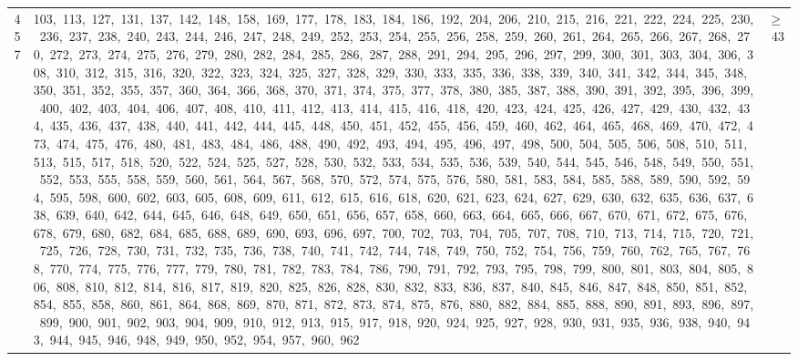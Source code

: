 \begin{longtable}{c|p{}|r}
457 & 103,\ 113,\ 127,\ 131,\ 137,\ 142,\ 148,\ 158,\ 169,\ 177,\ 178,\ 183,\ 184,\ 186,\ 192,\ 204,\ 206,\ 210,\ 215,\ 216,\ 221,\ 222,\ 224,\ 225,\ 230,\ 236,\ 237,\ 238,\ 240,\ 243,\ 244,\ 246,\ 247,\ 248,\ 249,\ 252,\ 253,\ 254,\ 255,\ 256,\ 258,\ 259,\ 260,\ 261,\ 264,\ 265,\ 266,\ 267,\ 268,\ 270,\ 272,\ 273,\ 274,\ 275,\ 276,\ 279,\ 280,\ 282,\ 284,\ 285,\ 286,\ 287,\ 288,\ 291,\ 294,\ 295,\ 296,\ 297,\ 299,\ 300,\ 301,\ 303,\ 304,\ 306,\ 308,\ 310,\ 312,\ 315,\ 316,\ 320,\ 322,\ 323,\ 324,\ 325,\ 327,\ 328,\ 329,\ 330,\ 333,\ 335,\ 336,\ 338,\ 339,\ 340,\ 341,\ 342,\ 344,\ 345,\ 348,\ 350,\ 351,\ 352,\ 355,\ 357,\ 360,\ 364,\ 366,\ 368,\ 370,\ 371,\ 374,\ 375,\ 377,\ 378,\ 380,\ 385,\ 387,\ 388,\ 390,\ 391,\ 392,\ 395,\ 396,\ 399,\ 400,\ 402,\ 403,\ 404,\ 406,\ 407,\ 408,\ 410,\ 411,\ 412,\ 413,\ 414,\ 415,\ 416,\ 418,\ 420,\ 423,\ 424,\ 425,\ 426,\ 427,\ 429,\ 430,\ 432,\ 434,\ 435,\ 436,\ 437,\ 438,\ 440,\ 441,\ 442,\ 444,\ 445,\ 448,\ 450,\ 451,\ 452,\ 455,\ 456,\ 459,\ 460,\ 462,\ 464,\ 465,\ 468,\ 469,\ 470,\ 472,\ 473,\ 474,\ 475,\ 476,\ 480,\ 481,\ 483,\ 484,\ 486,\ 488,\ 490,\ 492,\ 493,\ 494,\ 495,\ 496,\ 497,\ 498,\ 500,\ 504,\ 505,\ 506,\ 508,\ 510,\ 511,\ 513,\ 515,\ 517,\ 518,\ 520,\ 522,\ 524,\ 525,\ 527,\ 528,\ 530,\ 532,\ 533,\ 534,\ 535,\ 536,\ 539,\ 540,\ 544,\ 545,\ 546,\ 548,\ 549,\ 550,\ 551,\ 552,\ 553,\ 555,\ 558,\ 559,\ 560,\ 561,\ 564,\ 567,\ 568,\ 570,\ 572,\ 574,\ 575,\ 576,\ 580,\ 581,\ 583,\ 584,\ 585,\ 588,\ 589,\ 590,\ 592,\ 594,\ 595,\ 598,\ 600,\ 602,\ 603,\ 605,\ 608,\ 609,\ 611,\ 612,\ 615,\ 616,\ 618,\ 620,\ 621,\ 623,\ 624,\ 627,\ 629,\ 630,\ 632,\ 635,\ 636,\ 637,\ 638,\ 639,\ 640,\ 642,\ 644,\ 645,\ 646,\ 648,\ 649,\ 650,\ 651,\ 656,\ 657,\ 658,\ 660,\ 663,\ 664,\ 665,\ 666,\ 667,\ 670,\ 671,\ 672,\ 675,\ 676,\ 678,\ 679,\ 680,\ 682,\ 684,\ 685,\ 688,\ 689,\ 690,\ 693,\ 696,\ 697,\ 700,\ 702,\ 703,\ 704,\ 705,\ 707,\ 708,\ 710,\ 713,\ 714,\ 715,\ 720,\ 721,\ 725,\ 726,\ 728,\ 730,\ 731,\ 732,\ 735,\ 736,\ 738,\ 740,\ 741,\ 742,\ 744,\ 748,\ 749,\ 750,\ 752,\ 754,\ 756,\ 759,\ 760,\ 762,\ 765,\ 767,\ 768,\ 770,\ 774,\ 775,\ 776,\ 777,\ 779,\ 780,\ 781,\ 782,\ 783,\ 784,\ 786,\ 790,\ 791,\ 792,\ 793,\ 795,\ 798,\ 799,\ 800,\ 801,\ 803,\ 804,\ 805,\ 806,\ 808,\ 810,\ 812,\ 814,\ 816,\ 817,\ 819,\ 820,\ 825,\ 826,\ 828,\ 830,\ 832,\ 833,\ 836,\ 837,\ 840,\ 845,\ 846,\ 847,\ 848,\ 850,\ 851,\ 852,\ 854,\ 855,\ 858,\ 860,\ 861,\ 864,\ 868,\ 869,\ 870,\ 871,\ 872,\ 873,\ 874,\ 875,\ 876,\ 880,\ 882,\ 884,\ 885,\ 888,\ 890,\ 891,\ 893,\ 896,\ 897,\ 899,\ 900,\ 901,\ 902,\ 903,\ 904,\ 909,\ 910,\ 912,\ 913,\ 915,\ 917,\ 918,\ 920,\ 924,\ 925,\ 927,\ 928,\ 930,\ 931,\ 935,\ 936,\ 938,\ 940,\ 943,\ 944,\ 945,\ 946,\ 948,\ 949,\ 950,\ 952,\ 954,\ 957,\ 960,\ 962 & $\ge$ 43 \\

\end{longtable}

